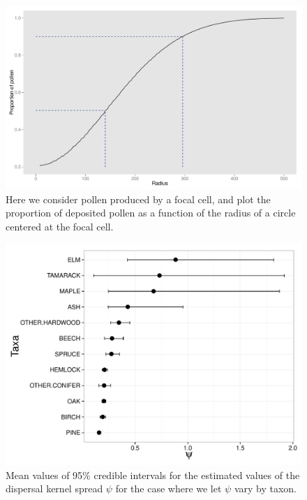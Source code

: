 \begin{figure}
\centering
\includegraphics[width=7in]{figures/dispersal_vs_distance.pdf}
\caption{Here we consider pollen produced by a focal cell, and plot the proportion of deposited pollen as a function of the radius of a circle centered at the focal cell.}
\label{fig:dvd}
\end{figure}

\begin{figure}
\centering
\includegraphics[width=7in]{figures/psi_vary_psi.pdf}
\caption{Mean values of 95\% credible intervals for the estimated values of the dispersal kernel spread $\psi$ for the case where we let $\psi$ vary by taxon.}
\label{fig:psi_vary_psi}
\end{figure}

